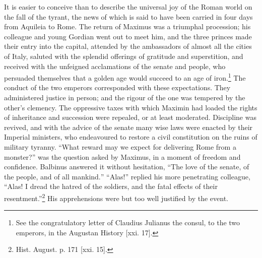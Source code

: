 It is easier to conceive than to describe the universal joy of the Roman world on the fall of the tyrant, the news of which is said to have been carried in four days from Aquileia to Rome. The return of Maximus was a triumphal procession; his colleague and young Gordian went out to meet him, and the three princes made their entry into the capital, attended by the ambassadors of almost all the cities of Italy, saluted with the splendid offerings of gratitude and superstition, and received with the unfeigned acclamations of the senate and people, who persuaded themselves that a golden age would succeed to an age of iron.\footnote{See the congratulatory letter of Claudius Julianus the consul, to the two emperors, in the Augustan History [xxi. 17].} The conduct of the two emperors corresponded with these expectations. They administered justice in person; and the rigour of the one was tempered by the other\texthebrew{}’s clemency. The oppressive taxes with which Maximin had loaded the rights of inheritance and succession were repealed, or at least moderated. Discipline was revived, and with the advice of the senate many wise laws were enacted by their Imperial ministers, who endeavoured to restore a civil constitution on the ruins of military tyranny. \texthebrew{“}What reward may we expect for delivering Rome from a monster?\texthebrew{}” was the question asked by Maximus, in a moment of freedom and confidence. Balbinus answered it without hesitation, \texthebrew{“}The love of the senate, of the people, and of all mankind.\texthebrew{” “}Alas!\texthebrew{}” replied his more penetrating colleague, \texthebrew{“}Alas! I dread the hatred of the soldiers, and the fatal effects of their resentment.\texthebrew{}”\footnote{Hist. August. p. 171 [xxi. 15].} His apprehensions were but too well justified by the event.

